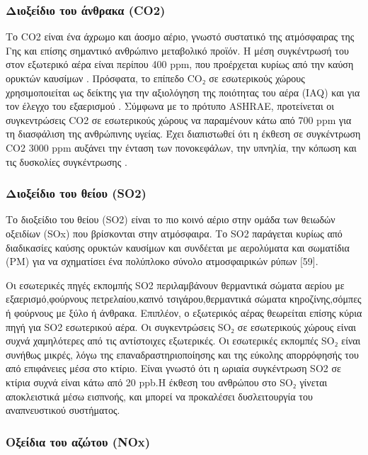 \subsubsection{Διοξείδιο του άνθρακα (CO2)}
Το CO2 είναι ένα άχρωμο και άοσμο αέριο, γνωστό συστατικό της ατμόσφαιρας της Γης και επίσης σημαντικό ανθρώπινο μεταβολικό προϊόν. Η μέση συγκέντρωσή του στον εξωτερικό αέρα είναι περίπου 400 ppm, που προέρχεται κυρίως από την καύση ορυκτών καυσίμων . Πρόσφατα, το επίπεδο CO₂ σε εσωτερικούς χώρους χρησιμοποιείται ως δείκτης για την αξιολόγηση της ποιότητας του αέρα (IAQ) και για τον έλεγχο του εξαερισμού . Σύμφωνα με το πρότυπο ASHRAE, προτείνεται οι συγκεντρώσεις CO2 σε εσωτερικούς χώρους να παραμένουν κάτω από 700 ppm για τη διασφάλιση της ανθρώπινης υγείας. Έχει διαπιστωθεί ότι η έκθεση σε συγκέντρωση CO2 3000 ppm αυξάνει την ένταση των πονοκεφάλων, την υπνηλία, την κόπωση και τις δυσκολίες συγκέντρωσης \cite{ijerph17082927}.



\subsubsection{Διοξείδιο του θείου (SO2)}

Το διοξείδιο του θείου (SO2) είναι το πιο κοινό αέριο στην ομάδα των θειωδών οξειδίων (SOx) που βρίσκονται στην ατμόσφαιρα. Το SO2 παράγεται κυρίως από διαδικασίες καύσης ορυκτών καυσίμων και συνδέεται με αερολύματα και σωματίδια (PM) για να σχηματίσει ένα πολύπλοκο σύνολο ατμοσφαιρικών ρύπων [59].

Οι εσωτερικές πηγές εκπομπής SO2 περιλαμβάνουν θερμαντικά σώματα αερίου με εξαερισμό,φούρνους πετρελαίου,καπνό τσιγάρου,θερμαντικά σώματα κηροζίνης,σόμπες ή φούρνους με ξύλο ή άνθρακα.
Επιπλέον, ο εξωτερικός αέρας θεωρείται επίσης κύρια πηγή για SO2 εσωτερικού  αέρα. Οι συγκεντρώσεις SO₂ σε εσωτερικούς χώρους είναι συχνά χαμηλότερες από τις αντίστοιχες εξωτερικές. Οι εσωτερικές εκπομπές SO₂ είναι συνήθως μικρές, λόγω της επαναδραστηριοποίησης και της εύκολης απορρόφησής του από επιφάνειες μέσα στο κτίριο. Είναι γνωστό ότι η ωριαία συγκέντρωση SO2 σε κτίρια συχνά είναι κάτω από 20 ppb.Η έκθεση του ανθρώπου στο SO₂ γίνεται αποκλειστικά μέσω εισπνοής, και μπορεί να προκαλέσει δυσλειτουργία του αναπνευστικού συστήματος.

\cite{ijerph17082927}


\subsubsection{Οξείδια του αζώτου (NOx)}

